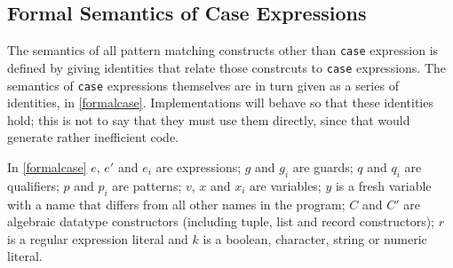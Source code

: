 
\subsection{Formal Semantics of Case Expressions}

The semantics of all pattern matching constructs other than \texttt{case} expression is defined by giving identities that relate those constrcuts to \texttt{case} expressions. The semantics of \texttt{case} expressions themselves are in turn given as a series of identities, in \autoref{formalcase}. Implementations will behave so that these identities hold; this is not to say that they must use them directly, since that would generate rather inefficient code.

In \autoref{formalcase} $e$, $e'$ and $e_i$ are expressions; $g$ and $g_i$ are guards; $q$ and $q_i$ are qualifiers; $p$ and  $p_i$ are patterns; $v$, $x$ and $x_i$ are variables; $y$ is a fresh variable with a name that differs from all other names in the program; $C$ and $C'$ are algebraic datatype constructors (including tuple, list and record constructors); $r$ is a regular expression literal and $k$ is a boolean, character, string or numeric literal.

